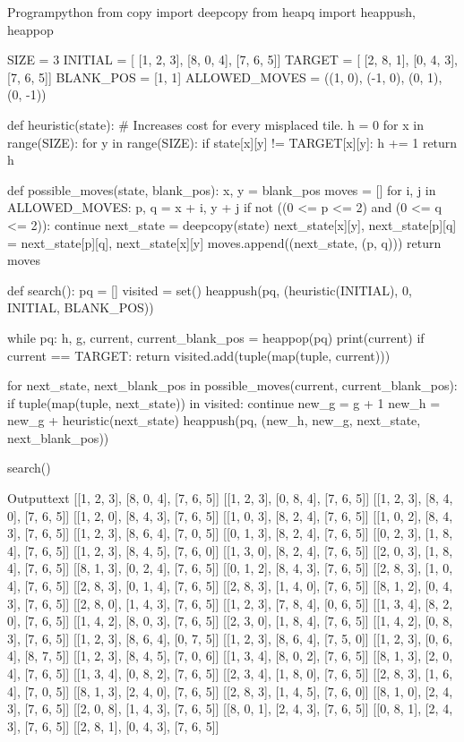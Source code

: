 \documentclass[11pt]{ipu-ai}
\begin{document}
    \begin{code}
        {Program}{python}
from copy import deepcopy
from heapq import heappush, heappop

SIZE = 3
INITIAL = [
    [1, 2, 3],
    [8, 0, 4],
    [7, 6, 5]]
TARGET = [
    [2, 8, 1],
    [0, 4, 3],
    [7, 6, 5]]
BLANK_POS = [1, 1]
ALLOWED_MOVES = ((1, 0), (-1, 0), (0, 1), (0, -1))


def heuristic(state):
    # Increases cost for every misplaced tile.
    h = 0
    for x in range(SIZE):
        for y in range(SIZE):
            if state[x][y] != TARGET[x][y]:
                h += 1
    return h


def possible_moves(state, blank_pos):
    x, y = blank_pos
    moves = []
    for i, j in ALLOWED_MOVES:
        p, q = x + i, y + j
        if not ((0 <= p <= 2) and (0 <= q <= 2)):
            continue
        next_state = deepcopy(state)
        next_state[x][y], next_state[p][q] = next_state[p][q], next_state[x][y]
        moves.append((next_state, (p, q)))
    return moves


def search():
    pq = []
    visited = set()
    heappush(pq, (heuristic(INITIAL), 0, INITIAL, BLANK_POS))

    while pq:
        h, g, current, current_blank_pos = heappop(pq)
        print(current)
        if current == TARGET:
            return
        visited.add(tuple(map(tuple, current)))

        for next_state, next_blank_pos in possible_moves(current, current_blank_pos):
            if tuple(map(tuple, next_state)) in visited:
                continue
            new_g = g + 1
            new_h = new_g + heuristic(next_state)
            heappush(pq, (new_h, new_g, next_state, next_blank_pos))


search()
    \end{code}%
    \begin{code}
        {Output}{text}
[[1, 2, 3], [8, 0, 4], [7, 6, 5]]
[[1, 2, 3], [0, 8, 4], [7, 6, 5]]
[[1, 2, 3], [8, 4, 0], [7, 6, 5]]
[[1, 2, 0], [8, 4, 3], [7, 6, 5]]
[[1, 0, 3], [8, 2, 4], [7, 6, 5]]
[[1, 0, 2], [8, 4, 3], [7, 6, 5]]
[[1, 2, 3], [8, 6, 4], [7, 0, 5]]
[[0, 1, 3], [8, 2, 4], [7, 6, 5]]
[[0, 2, 3], [1, 8, 4], [7, 6, 5]]
[[1, 2, 3], [8, 4, 5], [7, 6, 0]]
[[1, 3, 0], [8, 2, 4], [7, 6, 5]]
[[2, 0, 3], [1, 8, 4], [7, 6, 5]]
[[8, 1, 3], [0, 2, 4], [7, 6, 5]]
[[0, 1, 2], [8, 4, 3], [7, 6, 5]]
[[2, 8, 3], [1, 0, 4], [7, 6, 5]]
[[2, 8, 3], [0, 1, 4], [7, 6, 5]]
[[2, 8, 3], [1, 4, 0], [7, 6, 5]]
[[8, 1, 2], [0, 4, 3], [7, 6, 5]]
[[2, 8, 0], [1, 4, 3], [7, 6, 5]]
[[1, 2, 3], [7, 8, 4], [0, 6, 5]]
[[1, 3, 4], [8, 2, 0], [7, 6, 5]]
[[1, 4, 2], [8, 0, 3], [7, 6, 5]]
[[2, 3, 0], [1, 8, 4], [7, 6, 5]]
[[1, 4, 2], [0, 8, 3], [7, 6, 5]]
[[1, 2, 3], [8, 6, 4], [0, 7, 5]]
[[1, 2, 3], [8, 6, 4], [7, 5, 0]]
[[1, 2, 3], [0, 6, 4], [8, 7, 5]]
[[1, 2, 3], [8, 4, 5], [7, 0, 6]]
[[1, 3, 4], [8, 0, 2], [7, 6, 5]]
[[8, 1, 3], [2, 0, 4], [7, 6, 5]]
[[1, 3, 4], [0, 8, 2], [7, 6, 5]]
[[2, 3, 4], [1, 8, 0], [7, 6, 5]]
[[2, 8, 3], [1, 6, 4], [7, 0, 5]]
[[8, 1, 3], [2, 4, 0], [7, 6, 5]]
[[2, 8, 3], [1, 4, 5], [7, 6, 0]]
[[8, 1, 0], [2, 4, 3], [7, 6, 5]]
[[2, 0, 8], [1, 4, 3], [7, 6, 5]]
[[8, 0, 1], [2, 4, 3], [7, 6, 5]]
[[0, 8, 1], [2, 4, 3], [7, 6, 5]]
[[2, 8, 1], [0, 4, 3], [7, 6, 5]]
    \end{code}
\end{document}
